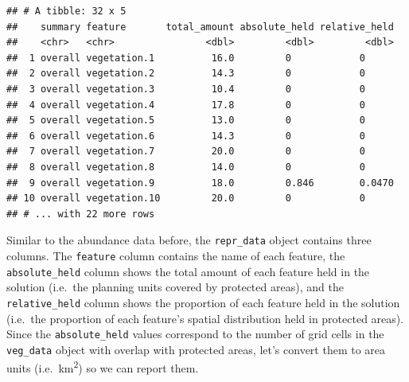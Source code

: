 \documentclass[
  12pt,
]{book}
\newenvironment{Shaded}{\begin{snugshade}}{\end{snugshade}}
\newcommand{\CommentTok}[1]{\textcolor[rgb]{0.56,0.35,0.01}{\textit{#1}}}
\newcommand{\DecValTok}[1]{\textcolor[rgb]{0.00,0.00,0.81}{#1}}
\newcommand{\KeywordTok}[1]{\textcolor[rgb]{0.13,0.29,0.53}{\textbf{#1}}}
\newcommand{\NormalTok}[1]{#1}
\newcommand{\OperatorTok}[1]{\textcolor[rgb]{0.81,0.36,0.00}{\textbf{#1}}}
\newcommand{\StringTok}[1]{\textcolor[rgb]{0.31,0.60,0.02}{#1}}
\begin{document}
\begin{verbatim}
## # A tibble: 32 x 5
##    summary feature       total_amount absolute_held relative_held
##    <chr>   <chr>                <dbl>         <dbl>         <dbl>
##  1 overall vegetation.1          16.0         0            0     
##  2 overall vegetation.2          14.3         0            0     
##  3 overall vegetation.3          10.4         0            0     
##  4 overall vegetation.4          17.8         0            0     
##  5 overall vegetation.5          13.0         0            0     
##  6 overall vegetation.6          14.3         0            0     
##  7 overall vegetation.7          20.0         0            0     
##  8 overall vegetation.8          14.0         0            0     
##  9 overall vegetation.9          18.0         0.846        0.0470
## 10 overall vegetation.10         20.0         0            0     
## # ... with 22 more rows
\end{verbatim}

Similar to the abundance data before, the \texttt{repr\_data} object contains three columns. The \texttt{feature} column contains the name of each feature, the \texttt{absolute\_held} column shows the total amount of each feature held in the solution (i.e.~the planning units covered by protected areas), and the \texttt{relative\_held} column shows the proportion of each feature held in the solution (i.e.~the proportion of each feature's spatial distribution held in protected areas). Since the \texttt{absolute\_held} values correspond to the number of grid cells in the \texttt{veg\_data} object with overlap with protected areas, let's convert them to area units (i.e.~km\textsuperscript{2}) so we can report them.

\begin{Shaded}
\end{Shaded}
\end{document}
